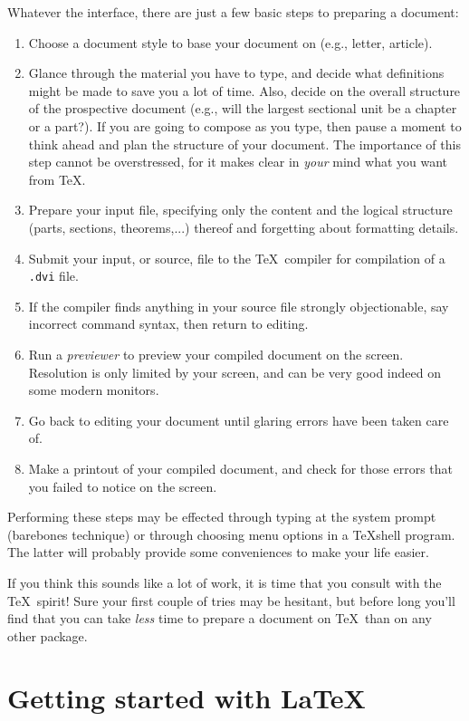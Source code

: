 Whatever the interface, there are just a few basic steps to preparing
a document:
\begin{enumerate}
\item Choose a document style to base your document on (e.g., letter, article).
\item Glance through the material you have to type, and decide what
	       definitions might be made to save you a lot of time.  Also, decide on
	       the overall structure of the prospective document (e.g., will the largest
	       sectional unit be a chapter or a part?).  If you are going to compose as
	       you type, then pause a moment to think ahead and plan the structure
	       of your document.  The importance of this step cannot be overstressed,
	       for it makes clear in {\em your\/} mind what you want from \TeX.
\item Prepare your input file, specifying only the content and the logical
	       structure (parts, sections, theorems,...) thereof and forgetting about formatting details.
\item Submit your input, or source, file to the \TeX\ compiler for compilation
		of a {\tt .dvi} file.
\item If the compiler finds anything in your source file strongly objectionable,
	       say incorrect command syntax, then return to editing.
\item Run a {\em previewer\/} to preview your compiled document on the
	       screen.  Resolution is only limited by your screen, and can be very
		good indeed on some modern monitors.
\item Go back to editing your document until glaring errors have been taken
		care of.
\item Make a printout of your compiled document, and check for those errors that
		you failed to notice on the screen.
\end{enumerate}
Performing these steps may be effected through typing at the system prompt
(barebones technique) or through choosing menu options in a {\TeX}shell program.
The latter will probably provide some conveniences to make your life easier.

If you think this sounds like a lot of work, it is time that you consult with the
\TeX\ spirit!  Sure your first couple of tries may be hesitant, but before long
you'll find that you can take {\em less\/} time to prepare a document on \TeX\
than on any other package.


\chapter{Getting started with \LaTeX}
